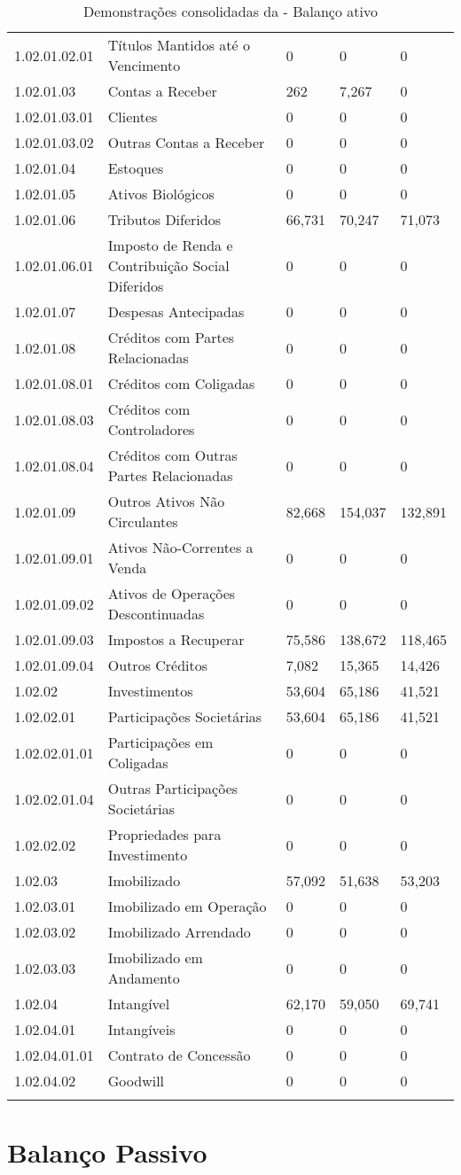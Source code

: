 \begin{center}
\begin{longtable}{p{}|p{}|p{}|p{}|p{}}
1.02.01.02.01 & Títulos Mantidos até o Vencimento & 0 & 0 & 0\tabularnewline
1.02.01.03 & Contas a Receber & 262 & 7,267 & 0\tabularnewline
1.02.01.03.01 & Clientes & 0 & 0 & 0\tabularnewline
1.02.01.03.02 & Outras Contas a Receber & 0 & 0 & 0\tabularnewline
1.02.01.04 & Estoques & 0 & 0 & 0\tabularnewline
1.02.01.05 & Ativos Biológicos & 0 & 0 & 0\tabularnewline
1.02.01.06 & Tributos Diferidos & 66,731 & 70,247 & 71,073\tabularnewline
1.02.01.06.01 & Imposto de Renda e Contribuição Social Diferidos & 0 & 0 & 0\tabularnewline
1.02.01.07 & Despesas Antecipadas & 0 & 0 & 0\tabularnewline
1.02.01.08 & Créditos com Partes Relacionadas & 0 & 0 & 0\tabularnewline
1.02.01.08.01 & Créditos com Coligadas & 0 & 0 & 0\tabularnewline
1.02.01.08.03 & Créditos com Controladores & 0 & 0 & 0\tabularnewline
1.02.01.08.04 & Créditos com Outras Partes Relacionadas & 0 & 0 & 0\tabularnewline
1.02.01.09 & Outros Ativos Não Circulantes & 82,668 & 154,037 & 132,891\tabularnewline
1.02.01.09.01 & Ativos Não-Correntes a Venda & 0 & 0 & 0\tabularnewline
1.02.01.09.02 & Ativos de Operações Descontinuadas & 0 & 0 & 0\tabularnewline
1.02.01.09.03 & Impostos a Recuperar & 75,586 & 138,672 & 118,465\tabularnewline
1.02.01.09.04 & Outros Créditos & 7,082 & 15,365 & 14,426\tabularnewline
1.02.02 & Investimentos & 53,604 & 65,186 & 41,521\tabularnewline
1.02.02.01 & Participações Societárias & 53,604 & 65,186 & 41,521\tabularnewline
1.02.02.01.01 & Participações em Coligadas & 0 & 0 & 0\tabularnewline
1.02.02.01.04 & Outras Participações Societárias & 0 & 0 & 0\tabularnewline
1.02.02.02 & Propriedades para Investimento & 0 & 0 & 0\tabularnewline
1.02.03 & Imobilizado & 57,092 & 51,638 & 53,203\tabularnewline
1.02.03.01 & Imobilizado em Operação & 0 & 0 & 0\tabularnewline
1.02.03.02 & Imobilizado Arrendado & 0 & 0 & 0\tabularnewline
1.02.03.03 & Imobilizado em Andamento & 0 & 0 & 0\tabularnewline
1.02.04 & Intangível & 62,170 & 59,050 & 69,741\tabularnewline
1.02.04.01 & Intangíveis & 0 & 0 & 0\tabularnewline
1.02.04.01.01 & Contrato de Concessão & 0 & 0 & 0\tabularnewline
1.02.04.02 & Goodwill & 0 & 0 & 0\tabularnewline
\hline 
\caption{Demonstrações consolidadas da \nomeCompletoPositivo{} - Balanço ativo}
\end{longtable}
\vspace*{-40pt}
\par\end{center}

\section{Balanço Passivo}

